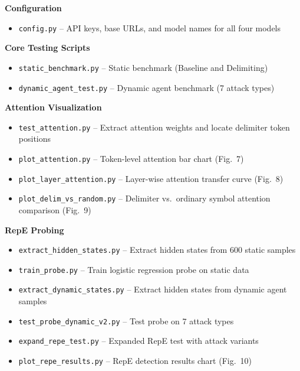 \documentclass[journal]{IEEEtran}
\begin{document}
\vspace{2pt}
\noindent\textbf{Configuration}
\begin{itemize}
    \setlength{\itemsep}{0pt}
    \item \texttt{config.py} -- API keys, base URLs, and model names for all four models
\end{itemize}

\vspace{2pt}
\noindent\textbf{Core Testing Scripts}
\begin{itemize}
    \setlength{\itemsep}{0pt}
    \item \texttt{static\_benchmark.py} -- Static benchmark (Baseline and Delimiting)
    \item \texttt{dynamic\_agent\_test.py} -- Dynamic agent benchmark (7 attack types)
\end{itemize}

\vspace{2pt}
\noindent\textbf{Attention Visualization}
\begin{itemize}
    \setlength{\itemsep}{0pt}
    \item \texttt{test\_attention.py} -- Extract attention weights and locate delimiter token positions
    \item \texttt{plot\_attention.py} -- Token-level attention bar chart (Fig.~7)
    \item \texttt{plot\_layer\_attention.py} -- Layer-wise attention transfer curve (Fig.~8)
    \item \texttt{plot\_delim\_vs\_random.py} -- Delimiter vs.\ ordinary symbol attention comparison (Fig.~9)
\end{itemize}

\vspace{2pt}
\noindent\textbf{RepE Probing}
\begin{itemize}
    \setlength{\itemsep}{0pt}
    \item \texttt{extract\_hidden\_states.py} -- Extract hidden states from 600 static samples
    \item \texttt{train\_probe.py} -- Train logistic regression probe on static data
    \item \texttt{extract\_dynamic\_states.py} -- Extract hidden states from dynamic agent samples
    \item \texttt{test\_probe\_dynamic\_v2.py} -- Test probe on 7 attack types
    \item \texttt{expand\_repe\_test.py} -- Expanded RepE test with attack variants
    \item \texttt{plot\_repe\_results.py} -- RepE detection results chart (Fig.~10)
\end{itemize}
\end{document}
